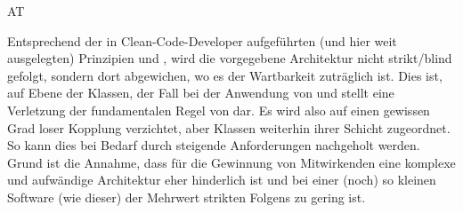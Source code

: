 \begin{enumerateWithCode}[0em plus 1em]{AT}
    \item\label{itm:A.1} Entsprechend der in Clean-Code-Developer aufgeführten (und hier weit ausgelegten) Prinzipien  und , wird die vorgegebene Architektur nicht strikt/blind gefolgt, sondern dort abgewichen, wo es der Wartbarkeit zuträglich ist.
    Dies ist, auf Ebene der Klassen, der Fall bei der Anwendung von  und stellt eine Verletzung der fundamentalen Regel von  dar.
    Es wird also auf einen gewissen Grad loser Kopplung verzichtet, aber Klassen weiterhin ihrer Schicht zugeordnet.
    So kann dies bei Bedarf durch steigende Anforderungen nachgeholt werden.
    Grund ist die Annahme, dass für die Gewinnung von Mitwirkenden eine komplexe und aufwändige Architektur eher hinderlich ist und bei einer (noch) so kleinen Software (wie dieser) der Mehrwert strikten Folgens zu gering ist.
\end{enumerateWithCode}
